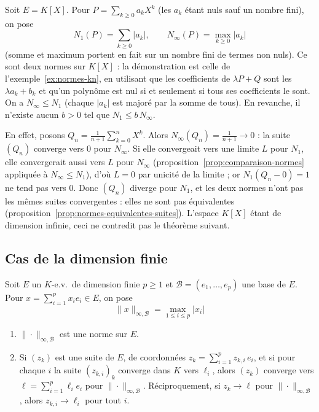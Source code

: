 \begin{exemple}
\label{ex:normes-non-equivalentes}
Soit $E=K[X]$. Pour $P=\sum_{k\geq 0}a_kX^k$ (les $a_k$ étant nuls sauf un nombre fini), on pose
\[N_1(P)=\sum_{k\geq 0}|a_k|,\qquad N_\infty(P)=\max_{k\geq 0}|a_k|\]
(somme et maximum portent en fait sur un nombre fini de termes non nuls). Ce sont deux normes sur $K[X]$ : la démonstration est celle de l'exemple~\ref{ex:normes-kn}, en utilisant que les coefficients de $\lambda P+Q$ sont les $\lambda a_k+b_k$ et qu'un polynôme est nul si et seulement si tous ses coefficients le sont. On a $N_\infty\leq N_1$ (chaque $|a_k|$ est majoré par la somme de tous). En revanche, il n'existe aucun $b>0$ tel que $N_1\leq b\,N_\infty$.

En effet, posons $Q_n=\frac{1}{n+1}\sum_{k=0}^{n}X^k$. Alors $N_\infty(Q_n)=\frac{1}{n+1}\to 0$ : la suite $(Q_n)$ converge vers $0$ pour $N_\infty$. Si elle convergeait vers une limite $L$ pour $N_1$, elle convergerait aussi vers $L$ pour $N_\infty$ (proposition~\ref{prop:comparaison-normes} appliquée à $N_\infty\leq N_1$), d'où $L=0$ par unicité de la limite ; or $N_1(Q_n-0)=1$ ne tend pas vers $0$. Donc $(Q_n)$ diverge pour $N_1$, et les deux normes n'ont pas les mêmes suites convergentes : elles ne sont pas équivalentes (proposition~\ref{prop:normes-equivalentes-suites}). L'espace $K[X]$ étant de dimension infinie, ceci ne contredit pas le théorème suivant.
\end{exemple}

\subsection{Cas de la dimension finie}

\begin{lemme}
\label{lemme:norme-infini-base}
Soit $E$ un $K$-e.v.\ de dimension finie $p\geq 1$ et $\mathcal{B}=(e_1,\dots,e_p)$ une base de $E$. Pour $x=\sum_{i=1}^{p}x_ie_i\in E$, on pose
\[\|x\|_{\infty,\mathcal{B}}=\max_{1\leq i\leq p}|x_i|\]
\begin{enumerate}
\item $\|\cdot\|_{\infty,\mathcal{B}}$ est une norme sur $E$.
\item Si $(z_k)$ est une suite de $E$, de coordonnées $z_k=\sum_{i=1}^{p}z_{k,i}\,e_i$, et si pour chaque $i$ la suite $(z_{k,i})_{k}$ converge dans $K$ vers $\ell_i$, alors $(z_k)$ converge vers $\ell=\sum_{i=1}^p\ell_ie_i$ pour $\|\cdot\|_{\infty,\mathcal{B}}$. Réciproquement, si $z_k\to\ell$ pour $\|\cdot\|_{\infty,\mathcal{B}}$, alors $z_{k,i}\to\ell_i$ pour tout $i$.
\end{enumerate}
\end{lemme}

